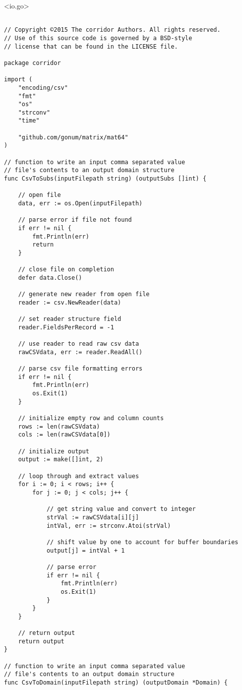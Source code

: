 \newpage

<io.go>

\begin{lstlisting}[basicstyle=\tiny]

// Copyright ©2015 The corridor Authors. All rights reserved.
// Use of this source code is governed by a BSD-style
// license that can be found in the LICENSE file.

package corridor

import (
	"encoding/csv"
	"fmt"
	"os"
	"strconv"
	"time"

	"github.com/gonum/matrix/mat64"
)

// function to write an input comma separated value
// file's contents to an output domain structure
func CsvToSubs(inputFilepath string) (outputSubs []int) {

	// open file
	data, err := os.Open(inputFilepath)

	// parse error if file not found
	if err != nil {
		fmt.Println(err)
		return
	}

	// close file on completion
	defer data.Close()

	// generate new reader from open file
	reader := csv.NewReader(data)

	// set reader structure field
	reader.FieldsPerRecord = -1

	// use reader to read raw csv data
	rawCSVdata, err := reader.ReadAll()

	// parse csv file formatting errors
	if err != nil {
		fmt.Println(err)
		os.Exit(1)
	}

	// initialize empty row and column counts
	rows := len(rawCSVdata)
	cols := len(rawCSVdata[0])

	// initialize output
	output := make([]int, 2)

	// loop through and extract values
	for i := 0; i < rows; i++ {
		for j := 0; j < cols; j++ {

			// get string value and convert to integer
			strVal := rawCSVdata[i][j]
			intVal, err := strconv.Atoi(strVal)

			// shift value by one to account for buffer boundaries
			output[j] = intVal + 1

			// parse error
			if err != nil {
				fmt.Println(err)
				os.Exit(1)
			}
		}
	}

	// return output
	return output
}

// function to write an input comma separated value
// file's contents to an output domain structure
func CsvToDomain(inputFilepath string) (outputDomain *Domain) {


\end{lstlisting}
